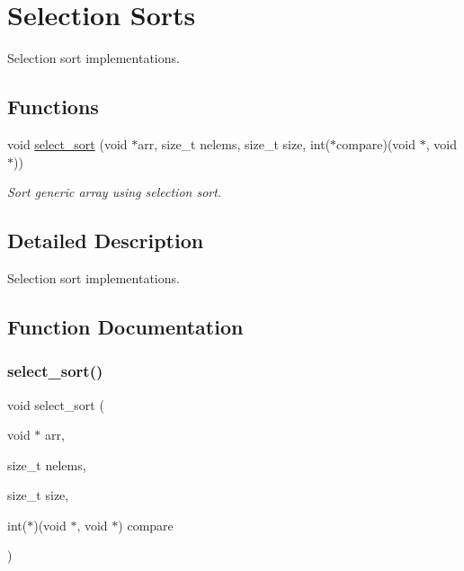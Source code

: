 \hypertarget{group__SelectionSort}{}\section{Selection Sorts}
\label{group__SelectionSort}


Selection sort implementations.  


\subsection*{Functions}
\begin{DoxyCompactItemize}
\item 
void \hyperlink{group__SelectionSort_ga6174e0499c83fdbe406f52cc09df7058}{select\+\_\+sort} (void $\ast$arr, size\+\_\+t nelems, size\+\_\+t size, int($\ast$compare)(void $\ast$, void $\ast$))
\begin{DoxyCompactList}\small\item\em Sort generic array using selection sort. \end{DoxyCompactList}\end{DoxyCompactItemize}


\subsection{Detailed Description}
Selection sort implementations. 



\subsection{Function Documentation}
\mbox{\label{group__SelectionSort_ga6174e0499c83fdbe406f52cc09df7058}} 
\subsubsection{\texorpdfstring{select\+\_\+sort()}{select\_sort()}}
{\footnotesize\ttfamily void select\+\_\+sort (\begin{DoxyParamCaption}\item[{void $\ast$}]{arr,  }\item[{size\+\_\+t}]{nelems,  }\item[{size\+\_\+t}]{size,  }\item[{int($\ast$)(void $\ast$, void $\ast$)}]{compare }\end{DoxyParamCaption})}



